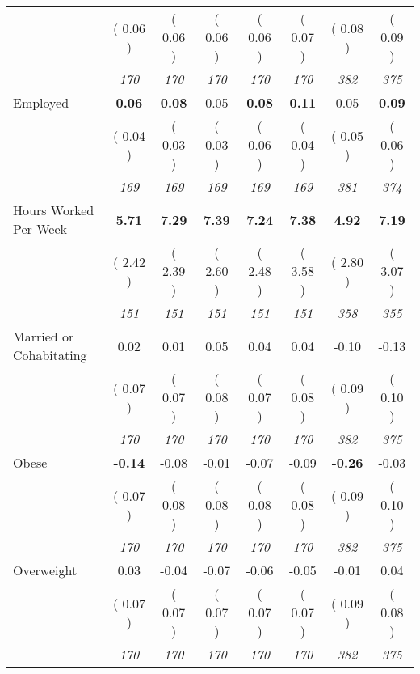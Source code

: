 \begin{tabular}{l c c c c c c c}
& (     0.06 ) & (     0.06 ) & (     0.06 ) & (     0.06 ) & (     0.07 ) & (     0.08 ) & (     0.09 ) \\
& \textit{ 170 } & \textit{ 170 } & \textit{ 170 } & \textit{ 170 } & \textit{ 170 } & \textit{ 382 } & \textit{ 375 } \\
Employed & \textbf{      0.06 } & \textbf{      0.08 } &      0.05 & \textbf{     0.08} & \textbf{     0.11} &      0.05 & \textbf{      0.09 } \\
& (     0.04 ) & (     0.03 ) & (     0.03 ) & (     0.06 ) & (     0.04 ) & (     0.05 ) & (     0.06 ) \\
& \textit{ 169 } & \textit{ 169 } & \textit{ 169 } & \textit{ 169 } & \textit{ 169 } & \textit{ 381 } & \textit{ 374 } \\
Hours Worked Per Week & \textbf{      5.71 } & \textbf{      7.29 } & \textbf{      7.39 } & \textbf{     7.24} & \textbf{     7.38} & \textbf{      4.92 } & \textbf{      7.19 } \\
& (     2.42 ) & (     2.39 ) & (     2.60 ) & (     2.48 ) & (     3.58 ) & (     2.80 ) & (     3.07 ) \\
& \textit{ 151 } & \textit{ 151 } & \textit{ 151 } & \textit{ 151 } & \textit{ 151 } & \textit{ 358 } & \textit{ 355 } \\
Married or Cohabitating &      0.02 &      0.01 &      0.05 &      0.04 &      0.04 &     -0.10 &     -0.13 \\
& (     0.07 ) & (     0.07 ) & (     0.08 ) & (     0.07 ) & (     0.08 ) & (     0.09 ) & (     0.10 ) \\
& \textit{ 170 } & \textit{ 170 } & \textit{ 170 } & \textit{ 170 } & \textit{ 170 } & \textit{ 382 } & \textit{ 375 } \\
Obese & \textbf{     -0.14 } &     -0.08 &     -0.01 &     -0.07 &     -0.09 & \textbf{     -0.26 } &     -0.03 \\
& (     0.07 ) & (     0.08 ) & (     0.08 ) & (     0.08 ) & (     0.08 ) & (     0.09 ) & (     0.10 ) \\
& \textit{ 170 } & \textit{ 170 } & \textit{ 170 } & \textit{ 170 } & \textit{ 170 } & \textit{ 382 } & \textit{ 375 } \\
Overweight &      0.03 &     -0.04 &     -0.07 &     -0.06 &     -0.05 &     -0.01 &      0.04 \\
& (     0.07 ) & (     0.07 ) & (     0.07 ) & (     0.07 ) & (     0.07 ) & (     0.09 ) & (     0.08 ) \\
& \textit{ 170 } & \textit{ 170 } & \textit{ 170 } & \textit{ 170 } & \textit{ 170 } & \textit{ 382 } & \textit{ 375 } \\

\end{tabular}
